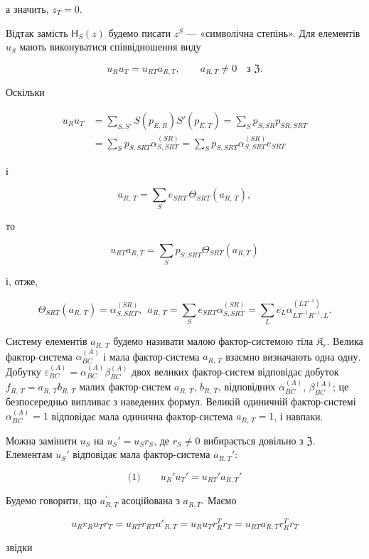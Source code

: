 \documentclass[11pt]{article}
\begin{document}
а значить, \(z_T=0\).

Відтак замість \(\mathsf{H}_S(z)\) будемо писати \(z^S\) --- «символічна степінь». Для елементів \(u_S\) мають виконуватися співвідношення виду

\[
u_Ru_T=u_{RT}a_{R,T},\qquad a_{R,T}\ne0\quad\text{з }\mathfrak Z.
\]

Оскільки

\[
\begin{aligned}
u_Ru_T
&=\sum_{S,S'} S(p_{E,R})S'(p_{E,T})
=\sum_S p_{S,SR}p_{SR,SRT}\\
&=\sum_S p_{S,SRT}\alpha_{S,SRT}^{(SR)}
=\sum_S p_{S,SRT}\alpha_{S,SRT}^{(SR)}e_{SRT}
\end{aligned}
\]

і

\[a_{R,\,T} = \sum\limits_{S} e_{SRT}\, \Theta_{SRT} \left(a_{R,\,T}\right),\]

то

\[u_{RT} a_{R,T} = \sum\limits_{S} p_{S,SRT} \Theta_{SRT} (a_{R,T})\]

і, отже,

\[\Theta_{SRT}(a_{R,\,T}) = \alpha_{S,SRT}^{(SR)}, ~~ a_{R,\,T} = \sum\limits_{S} e_{SRT} \alpha_{S,SRT}^{(SR)} = \sum\limits_{L} e_{L} \alpha_{LT^{-1}R^{-1},L}^{(LT^{-1})}.\]

Систему елементів \(a_{R,\,T}\) будемо називати малою фактор-системою тіла \(\mathfrak K_r\). Велика фактор-система \(\alpha_{BC}^{(A)}\) і мала фактор-система \(a_{R,\,T}\) взаємно визначають одна одну. Добутку \(\varepsilon_{BC}^{(A)} = \alpha_{BC}^{(A)} \beta_{BC}^{(A)}\) двох великих фактор-систем відповідає добуток \(f_{R,\,T} = a_{R,\,T}b_{R,\,T}\) малих фактор-систем \(a_{R,\,T}\), \(b_{R,\,T}\), відповідних \(\alpha_{BC}^{(A)}\), \(\beta_{BC}^{(A)}\); це безпосередньо випливає з наведених формул. Великій одиничній фактор-системі \(\alpha_{BC}^{(A)} = 1\) відповідає мала одинична фактор-система \(a_{R,\,T} = 1\), і навпаки.

Можна замінити \(u_S\) на \(u_S'=u_Sr_S\), де \(r_S\neq 0\) вибирається довільно з \(\mathfrak Z\). Елементам \(u_S'\) відповідає мала фактор-система \(a_{R,T}'\):

\[
\text{(1)}\qquad u_R'u_T'=u_{RT}'a_{R,T}'
\]

Будемо говорити, що \(a_{R,T}^{\prime}\) асоційована з \(a_{R,T}\). Маємо

\[u_R r_R u_T r_T = u_{RT} r_{RT} a'_{R,T} = u_R u_T r_R^T r_T = u_{RT} a_{R,T} r_R^T r_T\]

звідки
\end{document}
